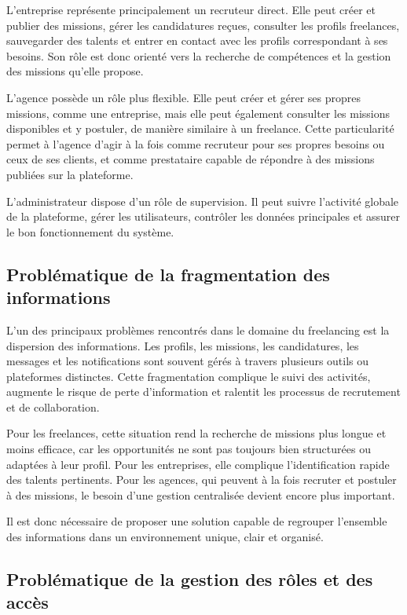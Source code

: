 L’entreprise représente principalement un recruteur direct. Elle peut créer et publier des missions, gérer les candidatures reçues, consulter les profils freelances, sauvegarder des talents et entrer en contact avec les profils correspondant à ses besoins. Son rôle est donc orienté vers la recherche de compétences et la gestion des missions qu’elle propose.

L’agence possède un rôle plus flexible. Elle peut créer et gérer ses propres missions, comme une entreprise, mais elle peut également consulter les missions disponibles et y postuler, de manière similaire à un freelance. Cette particularité permet à l’agence d’agir à la fois comme recruteur pour ses propres besoins ou ceux de ses clients, et comme prestataire capable de répondre à des missions publiées sur la plateforme.

L’administrateur dispose d’un rôle de supervision. Il peut suivre l’activité globale de la plateforme, gérer les utilisateurs, contrôler les données principales et assurer le bon fonctionnement du système.

\subsection{Problématique de la fragmentation des informations}

L’un des principaux problèmes rencontrés dans le domaine du freelancing est la dispersion des informations. Les profils, les missions, les candidatures, les messages et les notifications sont souvent gérés à travers plusieurs outils ou plateformes distinctes. Cette fragmentation complique le suivi des activités, augmente le risque de perte d’information et ralentit les processus de recrutement et de collaboration.

Pour les freelances, cette situation rend la recherche de missions plus longue et moins efficace, car les opportunités ne sont pas toujours bien structurées ou adaptées à leur profil. Pour les entreprises, elle complique l’identification rapide des talents pertinents. Pour les agences, qui peuvent à la fois recruter et postuler à des missions, le besoin d’une gestion centralisée devient encore plus important.

Il est donc nécessaire de proposer une solution capable de regrouper l’ensemble des informations dans un environnement unique, clair et organisé.

\subsection{Problématique de la gestion des rôles et des accès}

